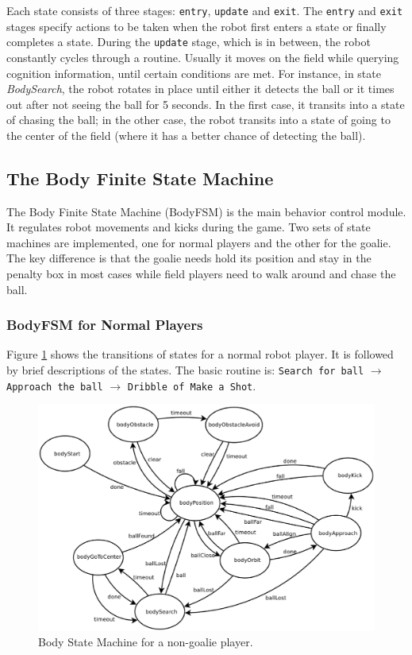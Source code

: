 \documentclass{article}
\begin{document}
	Each state consists of three stages:  \texttt{entry}, \texttt{update} and \texttt{exit}. The \texttt{entry} and \texttt{exit} stages specify actions to be taken when the robot first enters a state or finally completes a state. During the \texttt{update} stage, which is in between, the robot constantly cycles through a routine. Usually it moves on the field while querying cognition information, until certain conditions are met. For instance, in state \textit{BodySearch}, the robot rotates in place until either it detects the ball or it times out after not seeing the ball for 5 seconds. In the first case, it transits into a state of chasing the ball; in the other case, the robot transits into a state of going to the center of the field (where it has a better chance of detecting the ball).

\subsection{The Body Finite State Machine }
	The Body Finite State Machine (BodyFSM) is the main behavior control module. It regulates robot movements and kicks during the game. Two sets of state machines are implemented, one for normal players and the other for the goalie. The key difference is that the goalie needs hold its position and stay in the penalty box in most cases while field players need to walk around and chase the ball.

\subsubsection{BodyFSM for Normal Players}	
	Figure \ref{fig:bodyfsm} shows the transitions of states for a normal robot player. It is followed by brief descriptions of the states. The basic routine is: \texttt{Search for ball} $\to$ \texttt{Approach the ball} $\to$ \texttt{Dribble of Make a Shot}.
		
	\begin{figure}[H]
		\centering
		\includegraphics[width=\textwidth]{figures/BodyFSM.eps}
		\caption{Body State Machine for a non-goalie player.}
		\label{fig:bodyfsm}
	\end{figure}
		
\end{document}
